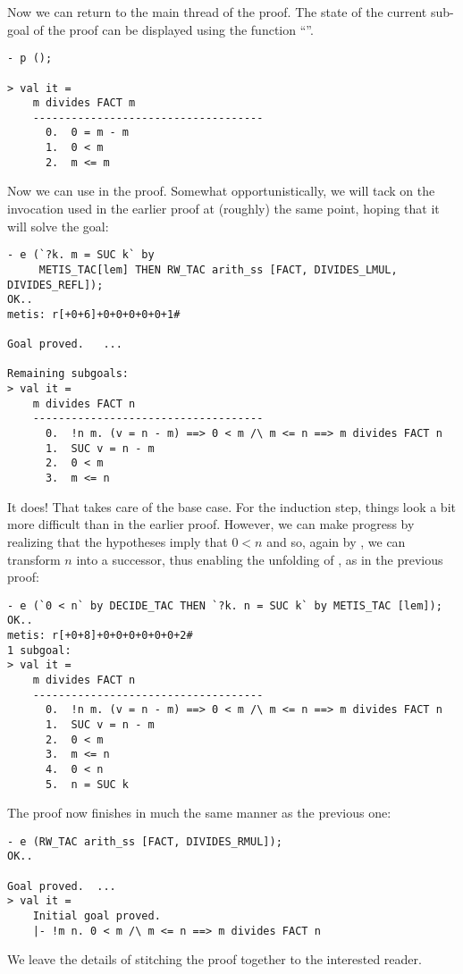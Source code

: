Now we can return to the main thread of the proof.  The state of the
current sub-goal of the proof can be displayed using the function
``''.

\begin{session}
\begin{verbatim}
- p ();

> val it =
    m divides FACT m
    ------------------------------------
      0.  0 = m - m
      1.  0 < m
      2.  m <= m
\end{verbatim}
\end{session}
    Now we can use  in the proof. Somewhat opportunistically,
    we will tack on the invocation used in the earlier proof at
    (roughly) the same point, hoping that it will solve the goal:
\begin{session}
\begin{verbatim}
- e (`?k. m = SUC k` by
     METIS_TAC[lem] THEN RW_TAC arith_ss [FACT, DIVIDES_LMUL, DIVIDES_REFL]);
OK..
metis: r[+0+6]+0+0+0+0+0+1#

Goal proved.   ...

Remaining subgoals:
> val it =
    m divides FACT n
    ------------------------------------
      0.  !n m. (v = n - m) ==> 0 < m /\ m <= n ==> m divides FACT n
      1.  SUC v = n - m
      2.  0 < m
      3.  m <= n
\end{verbatim}
\end{session}
    It does! That takes care of the base case. For the induction step,
    things look a bit more difficult than in the earlier proof.
    However, we can make progress by realizing that the hypotheses
    imply that $0 < n$ and so, again by , we can transform $n$
    into a successor, thus enabling the unfolding of , as in
    the previous proof:
\begin{session}
\begin{verbatim}
- e (`0 < n` by DECIDE_TAC THEN `?k. n = SUC k` by METIS_TAC [lem]);
OK..
metis: r[+0+8]+0+0+0+0+0+0+2#
1 subgoal:
> val it =
    m divides FACT n
    ------------------------------------
      0.  !n m. (v = n - m) ==> 0 < m /\ m <= n ==> m divides FACT n
      1.  SUC v = n - m
      2.  0 < m
      3.  m <= n
      4.  0 < n
      5.  n = SUC k
\end{verbatim}
\end{session}
\noindent The proof now finishes in much the same manner as the previous one:
\begin{session}
\begin{verbatim}
- e (RW_TAC arith_ss [FACT, DIVIDES_RMUL]);
OK..

Goal proved.  ...
> val it =
    Initial goal proved.
    |- !m n. 0 < m /\ m <= n ==> m divides FACT n
\end{verbatim}
\end{session}
\noindent We leave the details of stitching the proof together to the interested
reader.

